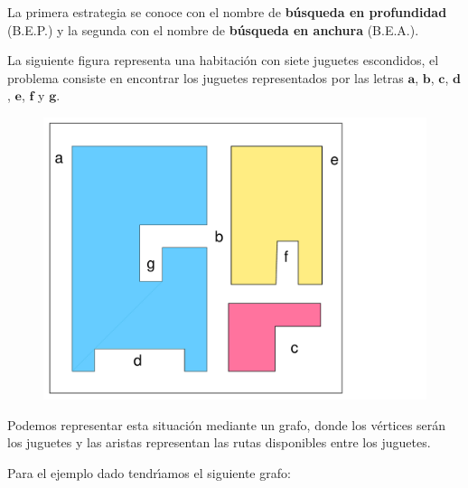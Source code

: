 \documentclass[ebook,oneside]{memoir}
\newcommand{\bolds}[1]{\boldsymbol{#1}}
\begin{document}
\vspace{0.2cm}
La primera estrategia se conoce con el nombre de \textbf{b\'{u}squeda en profundidad} (B.E.P.) y la segunda con el nombre de
\textbf{b\'{u}squeda en anchura} (B.E.A.).
\vspace{0.2cm}

La siguiente figura representa una habitaci\'{o}n con siete juguetes escondidos, el problema consiste en encontrar los juguetes representados por las
letras $\bolds{a}$, $\bolds{b}$, $\bolds{c}$, $\bolds{d}$, $\bolds{e}$, $\bolds{f}$ y $\bolds{g}$.


      \begin{center}
           \begin{figure}[h!]\centering
           \includegraphics[scale=0.14]{B1.pdf}
           \end{figure}
      \end{center}


\vspace{2.5cm}
Podemos representar esta situaci\'{o}n mediante un grafo, donde los v\'{e}rtices ser\'{a}n los juguetes y las aristas representan las rutas disponibles entre los juguetes.
\vspace{0.2cm}

Para el ejemplo dado tendr\'{\i}amos el siguiente grafo:
\end{document}
